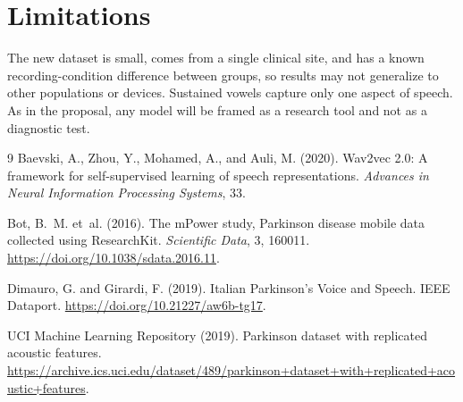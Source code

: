 \documentclass{article}
\begin{document}
\section{Limitations}
The new dataset is small, comes from a single clinical site, and has a known recording-condition difference between groups, so results may not generalize to other populations or devices. Sustained vowels capture only one aspect of speech. As in the proposal, any model will be framed as a research tool and not as a diagnostic test.

\begin{thebibliography}{9}
Baevski, A., Zhou, Y., Mohamed, A., and Auli, M. (2020).
Wav2vec 2.0: A framework for self-supervised learning of speech representations.
\emph{Advances in Neural Information Processing Systems}, 33.

Bot, B.~M. et~al. (2016).
The mPower study, Parkinson disease mobile data collected using ResearchKit.
\emph{Scientific Data}, 3, 160011.
\url{https://doi.org/10.1038/sdata.2016.11}.

Dimauro, G. and Girardi, F. (2019).
Italian Parkinson's Voice and Speech.
IEEE Dataport. \url{https://doi.org/10.21227/aw6b-tg17}.

UCI Machine Learning Repository (2019).
Parkinson dataset with replicated acoustic features.
\url{https://archive.ics.uci.edu/dataset/489/parkinson+dataset+with+replicated+acoustic+features}.
\end{thebibliography}
\end{document}

